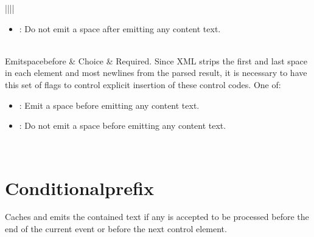 \documentclass[letterpaper,12pt,english,openany,oneside]{sphinxmanual}
\begin{document}
\begin{savenotes}
\begin{tabular}[t]{||||}
\begin{itemize}
\item {} 
: Do not emit a space after emitting any content text.

\end{itemize}
\\
\hline
Emit\sphinxhyphen{}space\sphinxhyphen{}before
&
Choice
&
Required. Since XML strips the first and last space in each element and most newlines from the parsed result, it is necessary to have this set of flags to control explicit insertion of these control codes. One of:
\begin{itemize}
\item {} 
: Emit a space before emitting any content text.

\item {} 
: Do not emit a space before emitting any content text.

\end{itemize}
\\
\hline
\end{tabular}
\par
\sphinxattableend\end{savenotes}


\section{Conditional\sphinxhyphen{}prefix}
\label{\detokenize{SaveAsXML_DirectivesRef:conditional-prefix}}
Caches and emits the contained text if any  is accepted to be processed before the end of the current event or before the next  control element.

\label{\detokenize{SaveAsXML_DirectivesRef:dtd-content-rule-4}}

\begin{sphinxVerbatim}[commandchars=\\\{\}]
\end{sphinxVerbatim}
\label{\detokenize{SaveAsXML_DirectivesRef:attributes-3}}
\end{document}
